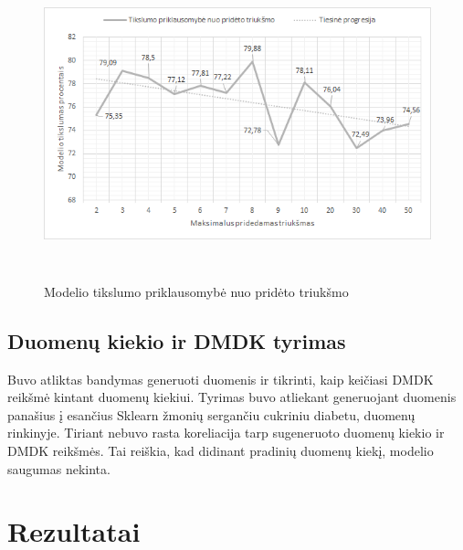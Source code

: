 \documentclass{VUMIFInfBakalaurinis}
\begin{document}
\begin{figure}[h]
  \centering
  \includegraphics[width=13cm,height=9cm,keepaspectratio]{img/tr_tyr_acc.png}
  \caption{Modelio tikslumo priklausomybė nuo pridėto triukšmo}
  \label{fig:Modelio tikslumo priklausomybė nuo pridėto triukšmo}
\end{figure}

\subsection{Duomenų kiekio ir DMDK tyrimas}
\par Buvo atliktas bandymas generuoti duomenis ir tikrinti, kaip keičiasi DMDK reikšmė kintant duomenų kiekiui. Tyrimas buvo atliekant generuojant duomenis panašius į esančius Sklearn žmonių sergančiu cukriniu diabetu, duomenų rinkinyje. Tiriant nebuvo rasta koreliacija tarp sugeneruoto duomenų kiekio ir DMDK reikšmės. Tai reiškia, kad didinant pradinių duomenų kiekį, modelio saugumas nekinta.

\section{Rezultatai}
\end{document}

